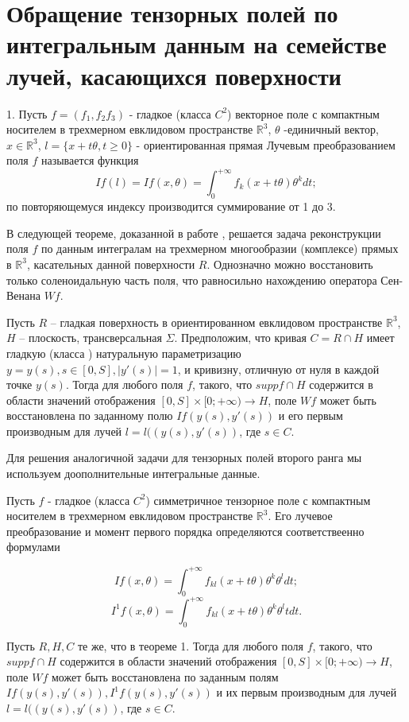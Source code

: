 \section{Обращение тензорных полей по интегральным данным на семействе лучей, касающихся поверхности}
1. Пусть $f=\left(f_1, f_2 f_3\right)$ - гладкое (класса $C^2$) векторное поле с компактным носителем в трехмерном евклидовом пространстве $\mathbb R^3$, $\theta$ -единичный вектор, $x\in \mathbb R^3$,  $l=\{x+t\theta, t\geq 0\}$ - ориентированная прямая Лучевым преобразованием поля $f$ называется функция
$$If(l)=If(x,\theta)=\int_0^{+\infty}f_k(x+t\theta)\theta^kdt;$$
по повторяющемуся индексу производится суммирование от 1 до 3.

В следующей теореме, доказанной в работе \cite{Medzhidov}, решается задача реконструкции поля  $f$ по данным интегралам   на трехмерном многообразии (комплексе) прямых в  $\mathbb R^3$, касательных данной поверхности $R$. Однозначно можно восстановить только соленоидальную часть поля, что  равносильно нахождению оператора Сен-Венана $Wf$.

\begin{theorem} Пусть $R$ – гладкая поверхность в ориентированном евклидовом пространстве $\mathbb R^3$, $H$ – плоскость, трансверсальная $\Sigma$. Предположим, что кривая $C=R\cap H$ имеет гладкую (класса  ) натуральную параметризацию $y=y(s), s\in [0,S],  |y'(s)|=1$, и кривизну, отличную от нуля в каждой точке $y(s)$. Тогда для любого поля $f$, такого, что  
$supp f\cap H$ содержится в области значений отображения $[0,S]\times [0;+\infty)\to H$, поле $Wf$ может быть восстановлена по заданному полю $If(y(s), y'(s))$ и его первым производным для лучей $l=l((y(s), y'(s))$, где $s\in C$.\
\end{theorem}

Для решения аналогичной задачи для тензорных полей второго ранга мы используем доополнительные интегральные данные. 

Пусть $f$ - гладкое (класса $C^2$) симметричное тензорное поле с компактным носителем в трехмерном евклидовом пространстве $\mathbb R^3$. Его лучевое преобразование и момент первого порядка определяются соответствеенно формулами

$$If(x,\theta)=\int_0^{+\infty}f_{kl}(x+t\theta)\theta^k\theta^ldt;$$
$$I^1f(x,\theta)=\int_0^{+\infty}f_{kl}(x+t\theta)\theta^k\theta^l tdt.$$

\begin{theorem} Пусть $R, H, C$ те же, что в теореме 1. Тогда для любого поля $f$, такого, что  
$supp f\cap H$ содержится в области значений отображения $[0,S]\times [0;+\infty)\to H$, поле $Wf$ может быть восстановлена по заданным полям $If(y(s), y'(s)),  I^1f(y(s), y'(s))$ и их первым производным для лучей $l=l((y(s), y'(s))$, где $s\in C$.
\end{theorem}


